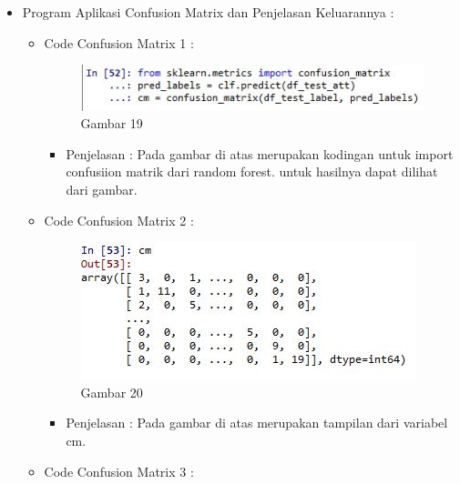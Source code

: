 \begin{enumerate}
\begin{itemize}
\begin{itemize}
\par
\par
\item Program Aplikasi Confusion Matrix dan Penjelasan Keluarannya :
\begin{itemize}
\item Code Confusion Matrix 1 :
\par
\begin{figure}[ht]
\centering
\includegraphics[scale=0.7]{figures/cod19.jpg}
\caption{Gambar 19}
\label{contoh}
\end{figure}
\par
\begin{itemize}
\item Penjelasan :  Pada gambar di atas merupakan kodingan untuk import confusiion matrik dari random forest. untuk hasilnya dapat dilihat dari gambar.
\par 
\par
\end{itemize}
\item Code Confusion Matrix 2 :
\par
\begin{figure}[ht]
\centering
\includegraphics[scale=0.7]{figures/cod20.jpg}
\caption{Gambar 20}
\label{contoh}
\end{figure}
\par
\begin{itemize}
\item Penjelasan : Pada gambar di atas merupakan tampilan dari variabel cm.
\par
\par
\end{itemize}
\item Code Confusion Matrix 3 :
\par
\begin{figure}[ht]
\centering

\end{figure}
\end{itemize}
\end{itemize}
\end{itemize}
\end{enumerate}
